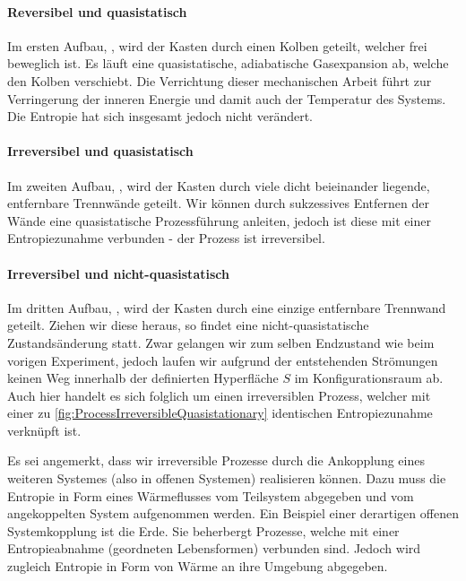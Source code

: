 \paragraph*{Reversibel und quasistatisch}
Im ersten Aufbau, , wird der Kasten durch einen Kolben geteilt, welcher frei beweglich ist. Es läuft eine quasistatische, adiabatische Gasexpansion ab, welche den Kolben verschiebt. Die Verrichtung dieser mechanischen Arbeit führt zur Verringerung der inneren Energie und damit auch der Temperatur des Systems. Die Entropie hat sich insgesamt jedoch nicht verändert.
\paragraph*{Irreversibel und quasistatisch}
Im zweiten Aufbau, , wird der Kasten durch viele dicht beieinander liegende, entfernbare Trennwände geteilt. Wir können durch sukzessives Entfernen der Wände eine quasistatische Prozessführung anleiten, jedoch ist diese mit einer Entropiezunahme verbunden - der Prozess ist irreversibel.
\paragraph*{Irreversibel und nicht-quasistatisch}
Im dritten Aufbau, , wird der Kasten durch eine einzige entfernbare Trennwand geteilt. Ziehen wir diese heraus, so findet eine nicht-quasistatische Zustandsänderung statt. Zwar gelangen wir zum selben Endzustand wie beim vorigen Experiment, jedoch laufen wir aufgrund der entstehenden Strömungen keinen Weg innerhalb der definierten Hyperfläche $S$ im Konfigurationsraum ab. Auch hier handelt es sich folglich um einen irreversiblen Prozess, welcher mit einer zu \ref{fig:ProcessIrreversibleQuasistationary} identischen Entropiezunahme verknüpft ist.

Es sei angemerkt, dass wir irreversible Prozesse durch die Ankopplung eines weiteren Systemes (also in offenen Systemen) realisieren können. Dazu muss die Entropie in Form eines Wärmeflusses vom Teilsystem abgegeben und vom angekoppelten System aufgenommen werden. 
Ein Beispiel einer derartigen offenen Systemkopplung ist die Erde. Sie beherbergt Prozesse, welche mit einer Entropieabnahme (geordneten Lebensformen) verbunden sind. Jedoch wird zugleich Entropie in Form von Wärme an ihre Umgebung abgegeben.

